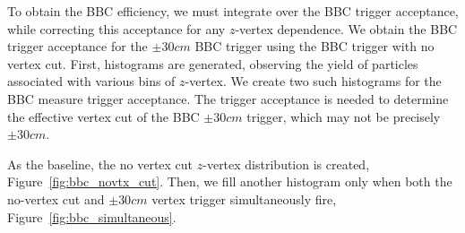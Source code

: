 To obtain the BBC efficiency, we must integrate over the BBC trigger acceptance,
while correcting this acceptance for any $z$-vertex dependence. We obtain the
BBC trigger acceptance for the $\pm30cm$ BBC trigger using the BBC trigger with
no vertex cut. First, histograms are generated, observing the yield of particles
associated with various bins of $z$-vertex. We create two such histograms for
the BBC measure trigger acceptance. The trigger acceptance is needed to
determine the effective vertex cut of the BBC $\pm30cm$ trigger, which may not
be precisely $\pm30cm$.

As the baseline, the no vertex cut $z$-vertex distribution is created,
Figure~\ref{fig:bbc_novtx_cut}. Then, we fill another histogram only when both
the no-vertex cut and $\pm30cm$ vertex trigger simultaneously fire,
Figure~\ref{fig:bbc_simultaneous}. 

